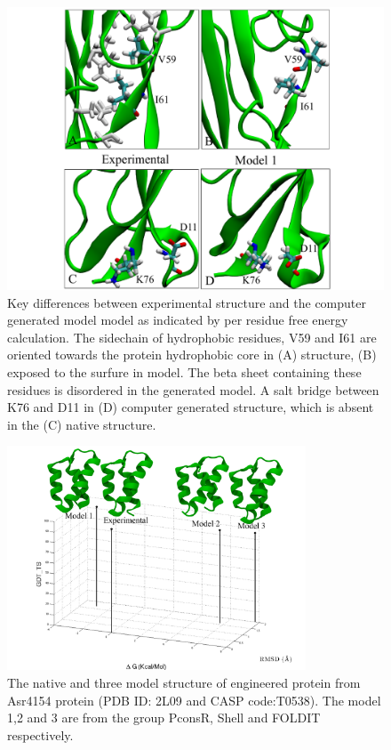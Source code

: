 \documentclass[12pt]{article}
\begin{document}
\begin{figure}
\begin{center}
\includegraphics[width=5 in,height=4 in]{T0569_perres2.pdf}
\end{center}
\caption{Key differences between experimental structure and the computer generated model model as indicated by per residue free energy calculation.
The sidechain of hydrophobic residues, V59 and I61 are oriented towards the protein hydrophobic core in (A)  
structure, (B) exposed to the surfure in model. The beta sheet containing these residues is disordered in the generated model.
A salt bridge between K76 and D11 in (D) computer generated structure, which is absent in the (C) native structure.}
\label{fig:T0569_per_residue}
\end{figure}

\begin{figure}
\begin{center}
\includegraphics[width=3.5in]{T0538.pdf}
\end{center}
\caption{The native and three model structure of engineered protein from Asr4154 protein (PDB ID: 2L09 and CASP
    code:T0538). The model 1,2 and 3 are from the group PconsR, Shell and FOLDIT respectively.}
\label{fig:T0538}
\end{figure}
\end{document}
